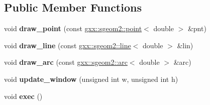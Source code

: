 \subsection*{Public Member Functions}
\begin{DoxyCompactItemize}
\item 
void {\bfseries draw\+\_\+point} (const \hyperlink{structgxx_1_1sgeom2_1_1point}{gxx\+::sgeom2\+::point}$<$ double $>$ \&pnt)\hypertarget{classgxx_1_1shower2d_aaa552a3d17c5cf07b8cb4d6a6e4f6524}{}\label{classgxx_1_1shower2d_aaa552a3d17c5cf07b8cb4d6a6e4f6524}

\item 
void {\bfseries draw\+\_\+line} (const \hyperlink{structgxx_1_1sgeom2_1_1line}{gxx\+::sgeom2\+::line}$<$ double $>$ \&lin)\hypertarget{classgxx_1_1shower2d_a391fa4f2321d2607b9b1f672f8477312}{}\label{classgxx_1_1shower2d_a391fa4f2321d2607b9b1f672f8477312}

\item 
void {\bfseries draw\+\_\+arc} (const \hyperlink{structgxx_1_1sgeom2_1_1arc}{gxx\+::sgeom2\+::arc}$<$ double $>$ \&arc)\hypertarget{classgxx_1_1shower2d_a1c68ed8bf17f9f5ded0d53fc91f56784}{}\label{classgxx_1_1shower2d_a1c68ed8bf17f9f5ded0d53fc91f56784}

\item 
void {\bfseries update\+\_\+window} (unsigned int w, unsigned int h)\hypertarget{classgxx_1_1shower2d_a7cd5ed742aa873035d6c9a3d31605394}{}\label{classgxx_1_1shower2d_a7cd5ed742aa873035d6c9a3d31605394}

\item 
void {\bfseries exec} ()\hypertarget{classgxx_1_1shower2d_a3789d91268aec71547ee9eb58ce73250}{}\label{classgxx_1_1shower2d_a3789d91268aec71547ee9eb58ce73250}

\end{DoxyCompactItemize}
